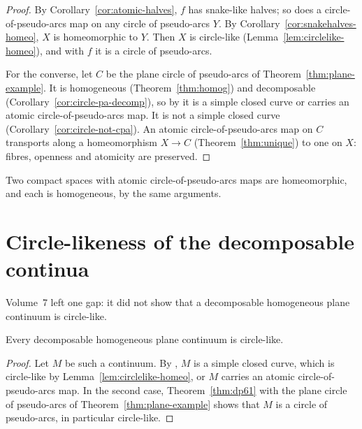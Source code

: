 \begin{proof}
By Corollary~\ref{cor:atomic-halves}, $f$ has snake-like halves; so does a circle-of-pseudo-arcs map on any circle of pseudo-arcs $Y$. By Corollary~\ref{cor:snakehalves-homeo},
$X$ is homeomorphic to $Y$. Then $X$ is circle-like (Lemma~\ref{lem:circlelike-homeo}), and with $f$ it is a circle of pseudo-arcs.

For the converse, let $C$ be the plane circle of pseudo-arcs of Theorem~\ref{thm:plane-example}. It is homogeneous (Theorem~\ref{thm:homog}) and decomposable
(Corollary~\ref{cor:circle-pa-decomp}), so by  it is a simple closed curve or carries an atomic circle-of-pseudo-arcs map. It is not a simple closed curve
(Corollary~\ref{cor:circle-not-cpa}). An atomic circle-of-pseudo-arcs map on $C$ transports along a homeomorphism $X\to C$ (Theorem~\ref{thm:unique}) to one on $X$: fibres,
openness and atomicity are preserved.
\end{proof}


Two compact spaces with atomic circle-of-pseudo-arcs maps are homeomorphic, and each is homogeneous, by the same arguments.


\section{Circle-likeness of the decomposable continua}

Volume~7 left one gap: it did not show that a decomposable homogeneous plane continuum is circle-like.

\begin{theorem}\label{thm:ho-circlelike}
Every decomposable homogeneous plane continuum is circle-like.
\end{theorem}

\begin{proof}
Let $M$ be such a continuum. By , $M$ is a simple closed curve, which is circle-like by Lemma~\ref{lem:circlelike-homeo}, or $M$ carries an atomic
circle-of-pseudo-arcs map. In the second case, Theorem~\ref{thm:dp61} with the plane circle of pseudo-arcs of Theorem~\ref{thm:plane-example} shows that $M$ is a circle of
pseudo-arcs, in particular circle-like.
\end{proof}

